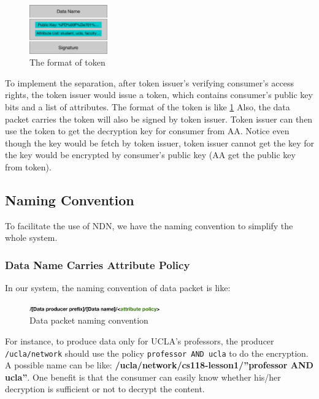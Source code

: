 \begin{figure}[H]
  \centering
  \includegraphics[width=0.3\textwidth]{figures/token}
  \vspace{-3mm}
  \caption{The format of token}
  \label{fig:token}
\end{figure}

To implement the separation, after token issuer's verifying consumer's access rights, the token issuer would issue a token, which contains consumer's public key bits and a list of attributes.
The format of the token is like \ref{fig:token}
Also, the data packet carries the token will also be signed by token issuer.
Token issuer can then use the token to get the decryption key for consumer from AA.
Notice even though the key would be fetch by token issuer, token issuer cannot get the key for the key would be encrypted by consumer's public key (AA get the public key from token).

\subsection{Naming Convention}

To facilitate the use of NDN, we have the naming convention to simplify the whole system.

\subsubsection{Data Name Carries Attribute Policy}

In our system, the naming convention of data packet is like:
\begin{figure}[H]
  \centering
  \includegraphics[width=0.5\textwidth]{figures/data-name}
  \vspace{-3mm}
  \caption{Data packet naming convention}
\end{figure}
For instance, to produce data only for UCLA's professors, the producer \texttt{/ucla/network} should use the policy \texttt{professor AND ucla} to do the encryption.
A possible name can be like: \textbf{/ucla/network/cs118-lesson1/''professor AND ucla''}.
One benefit is that the consumer can easily know whether his/her decryption is sufficient or not to decrypt the content.

